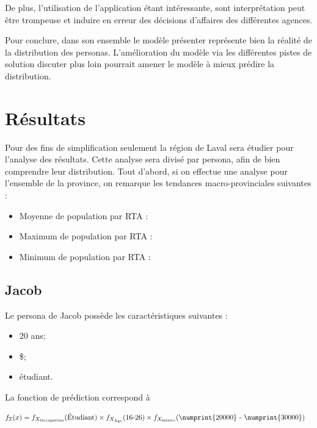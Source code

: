 \documentclass[11pt,french]{report}\usepackage[]{graphicx}\usepackage[]{color}
\begin{document}
De plus, l'utilisation de l'application étant intéressante, sont interprétation peut être trompeuse et induire en erreur des décisions d'affaires des différentes agences.

Pour conclure, dans son ensemble le modèle présenter représente bien la réalité de la distribution des personas. L'amélioration du modèle via les différentes pistes de solution discuter plus loin pourrait amener le modèle à mieux prédire la distribution.
 
\section*{Résultats}
Pour des fins de simplification seulement la région de Laval sera étudier pour l'analyse des résultats. Cette analyse sera divisé par persona, afin de bien comprendre leur distribution.
Tout d'abord, si on effectue une analyse pour l'ensemble de la province, on remarque les tendances macro-provinciales suivantes :

\begin{itemize}
\item Moyenne de population par RTA : 
\item Maximum de population par RTA : 
\item Minimum de population par RTA : 
\end{itemize}

\subsection*{Jacob}
Le persona de Jacob possède les caractéristiques suivantes : 
\begin{itemize}
\item 20 ans;
\item{} \$;
\item étudiant.
\end{itemize}
La fonction de prédiction correspond à

\begin{align*}
f_{\mathbb{X}}(x) &= f_{X_{\text{Occupation}}}(\text{Étudiant}) \times f_{X_{\text{Âge}}}(\text{16-26}) \times f_{X_{\text{salaire}}}(\text{\numprint{20000} - \numprint{30000}})
\end{align*}
\end{document}
